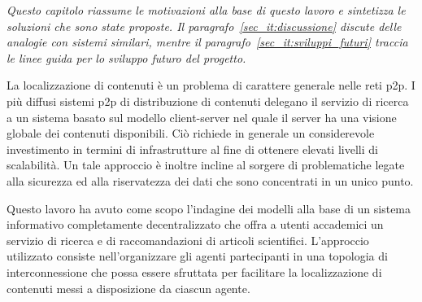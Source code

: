 
\textit{
Questo capitolo riassume le motivazioni alla base di questo lavoro e sintetizza le soluzioni che sono state proposte. Il paragrafo~\ref{sec_it:discussione} discute delle analogie con sistemi similari, mentre il paragrafo~\ref{sec_it:sviluppi_futuri} traccia le linee guida per lo sviluppo futuro del progetto.
}

La localizzazione di contenuti è un problema di carattere generale nelle reti p2p. I più diffusi sistemi p2p di distribuzione di contenuti delegano il servizio di ricerca a un sistema basato sul modello client-server nel quale il server ha una visione globale dei contenuti disponibili. Ciò richiede in generale un considerevole investimento in termini di infrastrutture al fine di ottenere elevati livelli di scalabilità. Un tale approccio è inoltre incline al sorgere di problematiche legate alla sicurezza ed alla riservatezza dei dati che sono concentrati in un unico punto.

Questo lavoro ha avuto come scopo l'indagine dei modelli alla base di un sistema informativo completamente decentralizzato che offra a utenti accademici un servizio di ricerca e di raccomandazioni di articoli scientifici. L'approccio utilizzato consiste nell'organizzare gli agenti partecipanti in una topologia di interconnessione che possa essere sfruttata per facilitare la localizzazione di contenuti messi a disposizione da ciascun agente.


